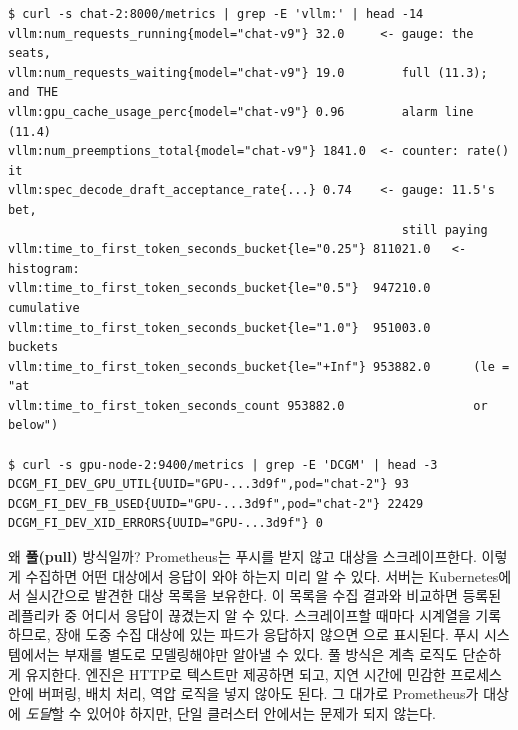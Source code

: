 \begin{terminalbox}
\begin{Verbatim}[breaklines=true,breakanywhere=true,fontsize=\small,formatcom=\color{tbbtermfg},codes=\tbbcodeactive]
$ curl -s chat-2:8000/metrics | grep -E 'vllm:' | head -14
vllm:num_requests_running{model="chat-v9"} 32.0     <- gauge: the seats,
vllm:num_requests_waiting{model="chat-v9"} 19.0        full (11.3); and THE
vllm:gpu_cache_usage_perc{model="chat-v9"} 0.96        alarm line (11.4)
vllm:num_preemptions_total{model="chat-v9"} 1841.0  <- counter: rate() it
vllm:spec_decode_draft_acceptance_rate{...} 0.74    <- gauge: 11.5's bet,
                                                       still paying
vllm:time_to_first_token_seconds_bucket{le="0.25"} 811021.0   <- histogram:
vllm:time_to_first_token_seconds_bucket{le="0.5"}  947210.0      cumulative
vllm:time_to_first_token_seconds_bucket{le="1.0"}  951003.0      buckets
vllm:time_to_first_token_seconds_bucket{le="+Inf"} 953882.0      (le = "at
vllm:time_to_first_token_seconds_count 953882.0                  or below")

$ curl -s gpu-node-2:9400/metrics | grep -E 'DCGM' | head -3
DCGM_FI_DEV_GPU_UTIL{UUID="GPU-...3d9f",pod="chat-2"} 93
DCGM_FI_DEV_FB_USED{UUID="GPU-...3d9f",pod="chat-2"} 22429
DCGM_FI_DEV_XID_ERRORS{UUID="GPU-...3d9f"} 0
\end{Verbatim}
\end{terminalbox}

왜 \textbf{풀(pull)} 방식일까? Prometheus는 푸시를 받지 않고 대상을 스크레이프한다. 이렇게 수집하면 어떤 대상에서 응답이 와야 하는지 미리 알 수 있다. 서버는 Kubernetes에서 실시간으로 발견한 대상 목록을 보유한다. 이 목록을 수집 결과와 비교하면 등록된 레플리카 중 어디서 응답이 끊겼는지 알 수 있다. 스크레이프할 때마다  시계열을 기록하므로, 장애 도중 수집 대상에 있는 파드가 응답하지 않으면 으로 표시된다. 푸시 시스템에서는 부재를 별도로 모델링해야만 알아낼 수 있다. 풀 방식은 계측 로직도 단순하게 유지한다. 엔진은 HTTP로 텍스트만 제공하면 되고, 지연 시간에 민감한 프로세스 안에 버퍼링, 배치 처리, 역압 로직을 넣지 않아도 된다. 그 대가로 Prometheus가 대상에 \textit{도달}할 수 있어야 하지만, 단일 클러스터 안에서는 문제가 되지 않는다.

